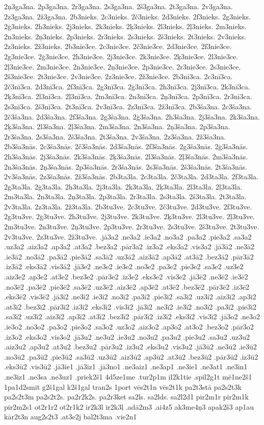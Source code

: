 {2ņ3ga3na.
2p3ga3na.
2r3ga3na.
2s3ga3na.
2š3ga3na.
2t3ga3na.
2v3ga3na.
2z3ga3na.
2ž3ga3na.
2b3nieks.
2c3nieks.
2č3nieks.
2d3nieks.
2f3nieks.
2g3nieks.
2ģ3nieks.
2h3nieks.
2j3nieks.
2k3nieks.
2ķ3nieks.
2l3nieks.
2ļ3nieks.
2m3nieks.
2n3nieks.
2ņ3nieks.
2p3nieks.
2r3nieks.
2s3nieks.
2š3nieks.
2t3nieks.
2v3nieks.
2z3nieks.
2ž3nieks.
2b3nie3ce.
2c3nie3ce.
2č3nie3ce.
2d3nie3ce.
2f3nie3ce.
2g3nie3ce.
2ģ3nie3ce.
2h3nie3ce.
2j3nie3ce.
2k3nie3ce.
2ķ3nie3ce.
2l3nie3ce.
2ļ3nie3ce.
2m3nie3ce.
2n3nie3ce.
2ņ3nie3ce.
2p3nie3ce.
2r3nie3ce.
2s3nie3ce.
2š3nie3ce.
2t3nie3ce.
2v3nie3ce.
2z3nie3ce.
2ž3nie3ce.
2b3nī3ca.
2c3nī3ca.
2č3nī3ca.
2d3nī3ca.
2f3nī3ca.
2g3nī3ca.
2ģ3nī3ca.
2h3nī3ca.
2j3nī3ca.
2k3nī3ca.
2ķ3nī3ca.
2l3nī3ca.
2ļ3nī3ca.
2m3nī3ca.
2n3nī3ca.
2ņ3nī3ca.
2p3nī3ca.
2r3nī3ca.
2s3nī3ca.
2š3nī3ca.
2t3nī3ca.
2v3nī3ca.
2z3nī3ca.
2ž3nī3ca.
2b3ša3na.
2c3ša3na.
2č3ša3na.
2d3ša3na.
2f3ša3na.
2g3ša3na.
2ģ3ša3na.
2h3ša3na.
2j3ša3na.
2k3ša3na.
2ķ3ša3na.
2l3ša3na.
2ļ3ša3na.
2m3ša3na.
2n3ša3na.
2ņ3ša3na.
2p3ša3na.
2r3ša3na.
2s3ša3na.
2š3ša3na.
2t3ša3na.
2v3ša3na.
2z3ša3na.
2ž3ša3na.
2b3ša3nās.
2c3ša3nās.
2č3ša3nās.
2d3ša3nās.
2f3ša3nās.
2g3ša3nās.
2ģ3ša3nās.
2h3ša3nās.
2j3ša3nās.
2k3ša3nās.
2ķ3ša3nās.
2l3ša3nās.
2ļ3ša3nās.
2m3ša3nās.
2n3ša3nās.
2ņ3ša3nās.
2p3ša3nās.
2r3ša3nās.
2s3ša3nās.
2š3ša3nās.
2t3ša3nās.
2v3ša3nās.
2z3ša3nās.
2ž3ša3nās.
2b3ta3la.
2c3ta3la.
2č3ta3la.
2d3ta3la.
2f3ta3la.
2g3ta3la.
2ģ3ta3la.
2h3ta3la.
2j3ta3la.
2k3ta3la.
2ķ3ta3la.
2l3ta3la.
2ļ3ta3la.
2m3ta3la.
2n3ta3la.
2ņ3ta3la.
2p3ta3la.
2r3ta3la.
2s3ta3la.
2š3ta3la.
2t3ta3la.
2v3ta3la.
2z3ta3la.
2ž3ta3la.
2b3tu3ve.
2c3tu3ve.
2č3tu3ve.
2d3tu3ve.
2f3tu3ve.
2g3tu3ve.
2ģ3tu3ve.
2h3tu3ve.
2j3tu3ve.
2k3tu3ve.
2ķ3tu3ve.
2l3tu3ve.
2ļ3tu3ve.
2m3tu3ve.
2n3tu3ve.
2ņ3tu3ve.
2p3tu3ve.
2r3tu3ve.
2s3tu3ve.
2š3tu3ve.
2t3tu3ve.
2v3tu3ve.
2z3tu3ve.
2ž3tu3ve.
.jā3a2
.ne3a2
.ie3a2
.no3a2
.pa3a2
.pie3a2
.sa3a2
.uz3a2
.aiz3a2
.ap3a2
.at3a2
.bez3a2
.pār3a2
.iz3a2
.eks3a2
.vis3a2
.jā3ā2
.ne3ā2
.ie3ā2
.no3ā2
.pa3ā2
.pie3ā2
.sa3ā2
.uz3ā2
.aiz3ā2
.ap3ā2
.at3ā2
.bez3ā2
.pār3ā2
.iz3ā2
.eks3ā2
.vis3ā2
.jā3e2
.ne3e2
.ie3e2
.no3e2
.pa3e2
.pie3e2
.sa3e2
.uz3e2
.aiz3e2
.ap3e2
.at3e2
.bez3e2
.pār3e2
.iz3e2
.eks3e2
.vis3e2
.jā3ē2
.ne3ē2
.ie3ē2
.no3ē2
.pa3ē2
.pie3ē2
.sa3ē2
.uz3ē2
.aiz3ē2
.ap3ē2
.at3ē2
.bez3ē2
.pār3ē2
.iz3ē2
.eks3ē2
.vis3ē2
.jā3i2
.ne3i2
.ie3i2
.no3i2
.pa3i2
.pie3i2
.sa3i2
.uz3i2
.aiz3i2
.ap3i2
.at3i2
.bez3i2
.pār3i2
.iz3i2
.eks3i2
.vis3i2
.jā3ī2
.ne3ī2
.ie3ī2
.no3ī2
.pa3ī2
.pie3ī2
.sa3ī2
.uz3ī2
.aiz3ī2
.ap3ī2
.at3ī2
.bez3ī2
.pār3ī2
.iz3ī2
.eks3ī2
.vis3ī2
.jā3o2
.ne3o2
.ie3o2
.no3o2
.pa3o2
.pie3o2
.sa3o2
.uz3o2
.aiz3o2
.ap3o2
.at3o2
.bez3o2
.pār3o2
.iz3o2
.eks3o2
.vis3o2
.jā3u2
.ne3u2
.ie3u2
.no3u2
.pa3u2
.pie3u2
.sa3u2
.uz3u2
.aiz3u2
.ap3u2
.at3u2
.bez3u2
.pār3u2
.iz3u2
.eks3u2
.vis3u2
.jā3ū2
.ne3ū2
.ie3ū2
.no3ū2
.pa3ū2
.pie3ū2
.sa3ū2
.uz3ū2
.aiz3ū2
.ap3ū2
.at3ū2
.bez3ū2
.pār3ū2
.iz3ū2
.eks3ū2
.vis3ū2
.jā3ie1
.jā3iz1
.jā3no1
.ne3aiz1
.ne3ap1
.ne3ie1
.ne3at1
.ne3in1
.ne3iz1
.ne3sa
.ne3uz1
.priek2š1
4d5ze1me
.tur2p1m
il2k1tie
.spil2g1t
mē1ne2š1
1pa1d2smit
g2š1gal
k2š1gal
tran2s
1port
vēs2t1n
vēs2t1k
pa2t3stā
pa2s2t3k
pa2s2t3m
pa2s2t2s.
pa2r2k2s.
pa2r3ket
sa2ls.
sa2lds.
sa2l2d1
pir2m1r
pir2m1k
pir2m2s1
ot2r1r2
ot2r1k2
ir2k3l
ir2k3ļ
.adā2m3
.ai4z5
ak3me4ņ3
apak2š3
ap1au
kār2t3n
aug2s2t3
.at3e2j
bal2t3ma
.vie2n1
}
